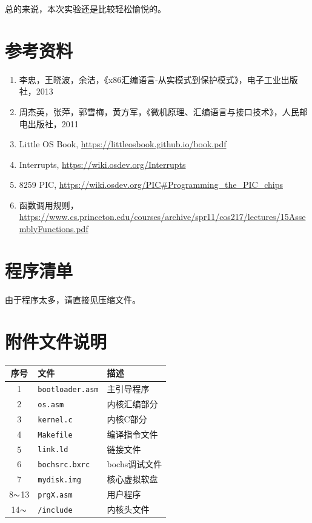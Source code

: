 \documentclass[logo,reportComp]{thesis}
\begin{document}
总的来说，本次实验还是比较轻松愉悦的。

\section{参考资料}
\begin{enumerate}
	\item 李忠，王晓波，余洁，《x86汇编语言-从实模式到保护模式》，电子工业出版社，2013
	\item 周杰英，张萍，郭雪梅，黄方军，《微机原理、汇编语言与接口技术》，人民邮电出版社，2011
	\item Little OS Book, \url{https://littleosbook.github.io/book.pdf}
	\item Interrupts, \url{https://wiki.osdev.org/Interrupts}
	\item 8259 PIC, \url{https://wiki.osdev.org/PIC#Programming_the_PIC_chips}
	\item 函数调用规则，\url{https://www.cs.princeton.edu/courses/archive/spr11/cos217/lectures/15AssemblyFunctions.pdf}
\end{enumerate}

\appendix
\appendixconfig
\section{程序清单}
\label{sec:code}
由于程序太多，请直接见压缩文件。

\section{附件文件说明}
\begin{center}
\begin{tabular}{|c|l|l|}\hline
序号 & 文件 & 描述 \\\hline
1 & \verb'bootloader.asm' & 主引导程序\\\hline
2 & \verb'os.asm' & 内核汇编部分\\\hline
3 & \verb'kernel.c' & 内核C部分\\\hline
4 & \verb'Makefile' & 编译指令文件\\\hline
5 & \verb'link.ld' & 链接文件\\\hline
6 & \verb'bochsrc.bxrc' & bochs调试文件\\\hline
7 & \verb'mydisk.img' & 核心虚拟软盘\\\hline
8$\thicksim$13 & \verb'prgX.asm' & 用户程序\\\hline
14$\thicksim$ & \verb'/include' & 内核头文件\\\hline
\end{tabular}
\end{center}
\end{document}
